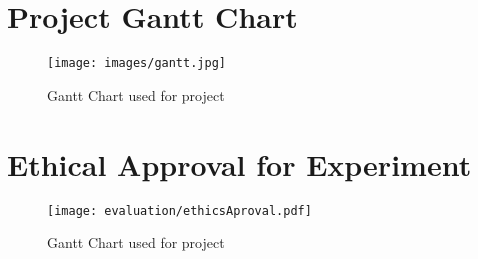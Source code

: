 \documentclass[11pt
              , a4paper
              , twoside
              , openright
              ]{report}
\begin{document}

\backmatter

 

%


\appendix
\clearpage
\chapter{Project Gantt Chart}
\label{ap:gantt}
\begin{figure}[h!]
  \centering
      \texttt{[image: images/gantt.jpg]}
  \caption{Gantt Chart used for project}
\end{figure}

\chapter{Ethical Approval for Experiment}
\label{ap:gantt}
\begin{figure}[h!]
  \centering
      \texttt{[image: evaluation/ethicsAproval.pdf]}
  \caption{Gantt Chart used for project}
\end{figure}
\end{document}
